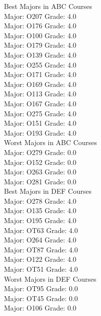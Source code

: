 Best Majors in ABC Courses\\
Major: O207     Grade: 4.0\\
Major: O176     Grade: 4.0\\
Major: O100     Grade: 4.0\\
Major: O179     Grade: 4.0\\
Major: O139     Grade: 4.0\\
Major: O255     Grade: 4.0\\
Major: O171     Grade: 4.0\\
Major: O169     Grade: 4.0\\
Major: O113     Grade: 4.0\\
Major: O167     Grade: 4.0\\
Major: O275     Grade: 4.0\\
Major: O151     Grade: 4.0\\
Major: O193     Grade: 4.0\\

Worst Majors in ABC Courses\\
Major: O279     Grade: 0.0\\
Major: O152     Grade: 0.0\\
Major: O263     Grade: 0.0\\
Major: O281     Grade: 0.0\\

Best Majors in DEF Courses\\
Major: O278     Grade: 4.0\\
Major: O135     Grade: 4.0\\
Major: O195     Grade: 4.0\\
Major: OT63     Grade: 4.0\\
Major: O264     Grade: 4.0\\
Major: OT87     Grade: 4.0\\
Major: O122     Grade: 4.0\\
Major: OT51     Grade: 4.0\\

Worst Majors in DEF Courses\\
Major: OT95     Grade: 0.0\\
Major: OT45     Grade: 0.0\\
Major: O106     Grade: 0.0\\
